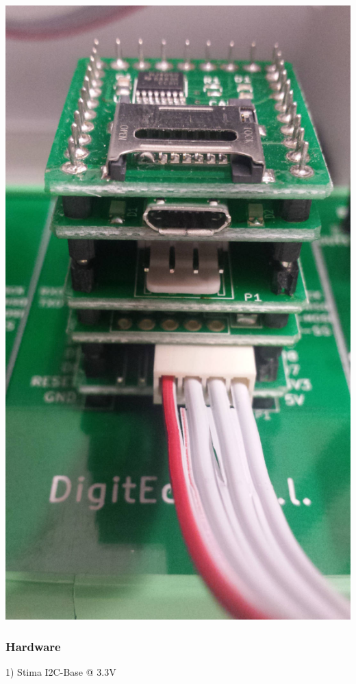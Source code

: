 \begin{DoxyImageNoCaption}
  \mbox{\includegraphics[width=\textwidth,height=\textheight/2,keepaspectratio=true]{rain.jpg}}
\end{DoxyImageNoCaption}
\hypertarget{index_stima_i2c_rain_hardware}{}\subsubsection{Hardware}\label{index_stima_i2c_rain_hardware}
1) Stima I2\+C-\/\+Base @ 3.\+3V

